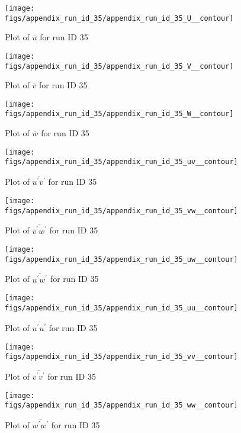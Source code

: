 \begin{figure}[H]
\centering
\texttt{[image: figs/appendix\_run\_id\_35/appendix\_run\_id\_35\_U\_\_contour]}
\caption{Plot of $\overline{u}$ for run ID 35}
\label{fig:appendix_run_id_35_U__contour}
\end{figure}


\begin{figure}[H]
\centering
\texttt{[image: figs/appendix\_run\_id\_35/appendix\_run\_id\_35\_V\_\_contour]}
\caption{Plot of $\overline{v}$ for run ID 35}
\label{fig:appendix_run_id_35_V__contour}
\end{figure}


\begin{figure}[H]
\centering
\texttt{[image: figs/appendix\_run\_id\_35/appendix\_run\_id\_35\_W\_\_contour]}
\caption{Plot of $\overline{w}$ for run ID 35}
\label{fig:appendix_run_id_35_W__contour}
\end{figure}


\begin{figure}[H]
\centering
\texttt{[image: figs/appendix\_run\_id\_35/appendix\_run\_id\_35\_uv\_\_contour]}
\caption{Plot of $\overline{u^\prime v^\prime}$ for run ID 35}
\label{fig:appendix_run_id_35_uv__contour}
\end{figure}


\begin{figure}[H]
\centering
\texttt{[image: figs/appendix\_run\_id\_35/appendix\_run\_id\_35\_vw\_\_contour]}
\caption{Plot of $\overline{v^\prime w^\prime}$ for run ID 35}
\label{fig:appendix_run_id_35_vw__contour}
\end{figure}


\begin{figure}[H]
\centering
\texttt{[image: figs/appendix\_run\_id\_35/appendix\_run\_id\_35\_uw\_\_contour]}
\caption{Plot of $\overline{u^\prime w^\prime}$ for run ID 35}
\label{fig:appendix_run_id_35_uw__contour}
\end{figure}


\begin{figure}[H]
\centering
\texttt{[image: figs/appendix\_run\_id\_35/appendix\_run\_id\_35\_uu\_\_contour]}
\caption{Plot of $\overline{u^\prime u^\prime}$ for run ID 35}
\label{fig:appendix_run_id_35_uu__contour}
\end{figure}


\begin{figure}[H]
\centering
\texttt{[image: figs/appendix\_run\_id\_35/appendix\_run\_id\_35\_vv\_\_contour]}
\caption{Plot of $\overline{v^\prime v^\prime}$ for run ID 35}
\label{fig:appendix_run_id_35_vv__contour}
\end{figure}


\begin{figure}[H]
\centering
\texttt{[image: figs/appendix\_run\_id\_35/appendix\_run\_id\_35\_ww\_\_contour]}
\caption{Plot of $\overline{w^\prime w^\prime}$ for run ID 35}
\label{fig:appendix_run_id_35_ww__contour}
\end{figure}


